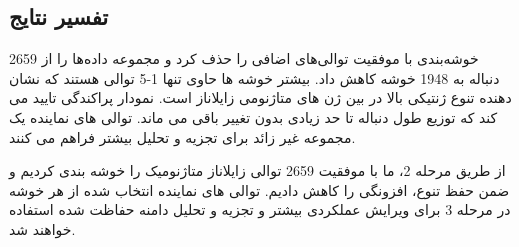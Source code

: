     \subsection*{تفسیر نتایج}

    خوشه‌بندی با موفقیت توالی‌های اضافی را حذف کرد و مجموعه داده‌ها را از 2659 دنباله به 1948 خوشه کاهش داد. بیشتر خوشه ها حاوی تنها 1-5 توالی هستند که نشان دهنده تنوع ژنتیکی بالا در بین ژن های متاژنومی زایلاناز است. نمودار پراکندگی تایید می کند که توزیع طول دنباله تا حد زیادی بدون تغییر باقی می ماند. توالی های نماینده یک مجموعه غیر زائد برای تجزیه و تحلیل بیشتر فراهم می کنند.

    از طریق مرحله 2، ما با موفقیت 2659 توالی زایلاناز متاژنومیک را خوشه بندی کردیم و ضمن حفظ تنوع، افزونگی را کاهش دادیم. توالی های نماینده انتخاب شده از هر خوشه در مرحله 3 برای ویرایش عملکردی بیشتر و تجزیه و تحلیل دامنه حفاظت شده استفاده خواهند شد.


